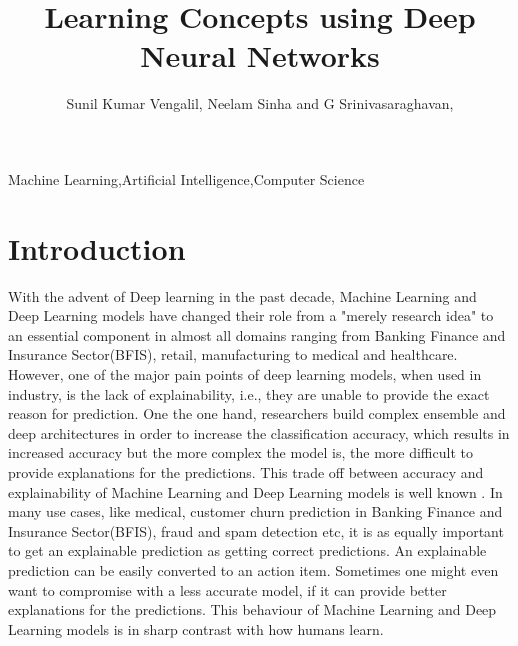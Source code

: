 \documentclass{JMLFS}
\begin{document}
\title{Learning Concepts using Deep Neural Networks}

\author{Sunil Kumar Vengalil, Neelam Sinha  and G Srinivasaraghavan,}
\address{$^1$International Institute of Information Technology Bangalore}
\address{$^2$International Institute of Information Technology Bangalore}
\address{$^3$International Institute of Information Technology Bangalore}

\begin{abstract}
\end{abstract}

\maketitle

\begin{keyword}
Machine Learning\sep Artificial Intelligence\sep Computer Science
\end{keyword}

\section{Introduction}
With the advent of Deep learning in the past decade,  Machine Learning and Deep Learning models have changed their role from a "merely research idea" to an essential component in almost all domains ranging from Banking Finance and Insurance Sector(BFIS), retail, manufacturing to medical\cite{jordan2015} and healthcare.
However, one of the major pain points of deep learning models, when used in industry, is the lack of explainability, i.e., they are unable to provide the exact reason for prediction.
One the one hand, researchers build complex ensemble and deep architectures in order to increase the classification accuracy, which results in increased accuracy but the more complex the model is, the more difficult to provide explanations for the predictions.
This trade off between accuracy and explainability of Machine Learning and Deep Learning models is well known \cite{wu2021}.
In many use cases, like medical, customer churn prediction in Banking Finance and Insurance Sector(BFIS), fraud and spam detection etc, it is as equally important to get an explainable prediction as getting correct predictions.
An explainable prediction can be easily converted to an action item.
Sometimes one might even want to compromise with a less accurate model, if it can provide better explanations for the predictions.
This behaviour of Machine Learning and Deep Learning models is in sharp contrast with how humans learn.
\end{document}
